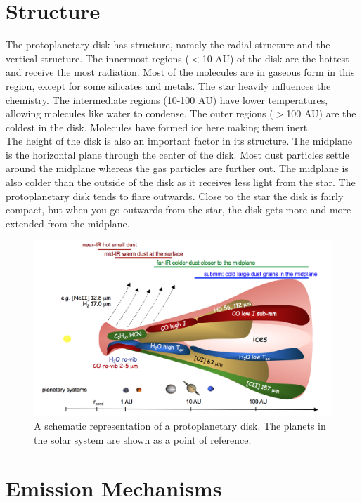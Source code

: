 \documentclass[twoside,single, authoryear, semicolon]{lion-msc}
\begin{document}
\section{Structure}
The protoplanetary disk has structure, namely the radial structure and the vertical structure. The innermost regions ($<$10 AU) of the disk are the hottest and receive the most radiation. Most of the molecules are in gaseous form in this region, except for some silicates and metals. The star heavily influences the chemistry. The intermediate regions (10-100 AU) have lower temperatures, allowing molecules like water to condense. The outer regions ($>$100 AU) are the coldest in the disk. Molecules have formed ice here making them inert. \\
The height of the disk is also an important factor in its structure. The midplane is the horizontal plane through the center of the disk. Most dust particles settle around the midplane whereas the gas particles are further out. The midplane is also colder than the outside of the disk as it receives less light from the star. The protoplanetary disk tends to flare outwards. Close to the star the disk is fairly compact, but when you go outwards from the star, the disk gets more and more extended from the midplane. 

\begin{figure}[!ht]
    \centering
    \includegraphics[width=\linewidth]{Figures/disk-sketch.png}
    \caption{A schematic representation of a protoplanetary disk. The planets in the solar system are shown as a point of reference. \cite{inproceedings}}
    \label{fig:enter-label}
\end{figure}


\section{Emission Mechanisms}
\end{document}
